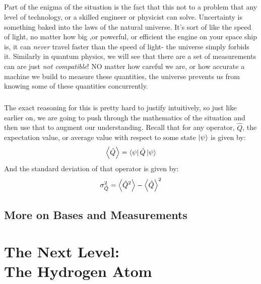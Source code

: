 \documentclass[12pt,letterpaper]{book}
\begin{document}
\paragraph*{}Part of the enigma of the situation is the fact that this not to a problem that any level of technology, or a skilled engineer or physicist can solve. Uncertainty is something baked into the laws of the natural universe. It's sort of like the speed of light, no matter how big ,or powerful, or efficient the engine on your space ship is, it can \textit{never} travel faster than the speed of light- the universe simply forbids it. Similarly in quantum physics, we will see that there are a set of measurements can are just \textit{not compatible}! NO matter how careful we are, or how accurate a machine we build to measure these quantities, the universe prevents us from knowing some of these quantities concurrently. 
\paragraph*{}The exact reasoning for this is pretty hard to justify intuitively, so just like earlier on, we are going to push through the mathematics of the situation and then use that to augment our understanding. Recall that for any operator, $\hat{Q}$, the expectation value, or average value with respect to some state $\ket{\psi}$ is given by:
\begin{equation}
\expval{\hat{Q}} = \bra{\psi}\hat{Q}\ket{\psi}
\end{equation}
And the standard deviation of that operator is given by:
\begin{equation}
\sigma^{2}_{\hat{Q}} =  \expval{\hat{Q}^2} - \expval{\hat{Q}}^2
\end{equation}



\section{More on Bases and Measurements}



\chapter{The Next Level: \\ The Hydrogen Atom}
\end{document}
